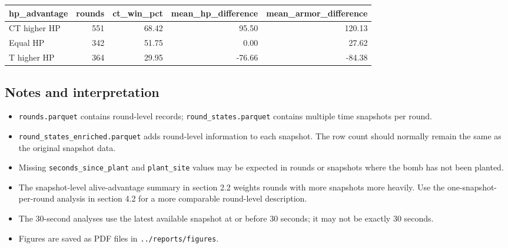 \documentclass[
  letterpaper,
  DIV=11,
  numbers=noendperiod]{scrartcl}
\newcounter{none} %
\providecommand{\tightlist}{%
  \setlength{\itemsep}{0pt}\setlength{\parskip}{0pt}}
\begin{document}
{\def\LTcaptype{none} %
\begin{longtable}[]{@{}lrrrr@{}}
\toprule\noalign{}
hp\_advantage & rounds & ct\_win\_pct & mean\_hp\_difference &
mean\_armor\_difference \\
\midrule\noalign{}
\endhead
\bottomrule\noalign{}
\endlastfoot
CT higher HP & 551 & 68.42 & 95.50 & 120.13 \\
Equal HP & 342 & 51.75 & 0.00 & 27.62 \\
T higher HP & 364 & 29.95 & -76.66 & -84.38 \\
\end{longtable}
}

\subsection{Notes and interpretation}\label{notes-and-interpretation}

\begin{itemize}
\tightlist
\item
  \texttt{rounds.parquet} contains round-level records;
  \texttt{round\_states.parquet} contains multiple time snapshots per
  round.
\item
  \texttt{round\_states\_enriched.parquet} adds round-level information
  to each snapshot. The row count should normally remain the same as the
  original snapshot data.
\item
  Missing \texttt{seconds\_since\_plant} and \texttt{plant\_site} values
  may be expected in rounds or snapshots where the bomb has not been
  planted.
\item
  The snapshot-level alive-advantage summary in section 2.2 weights
  rounds with more snapshots more heavily. Use the
  one-snapshot-per-round analysis in section 4.2 for a more comparable
  round-level description.
\item
  The 30-second analyses use the latest available snapshot at or before
  30 seconds; it may not be exactly 30 seconds.
\item
  Figures are saved as PDF files in \texttt{../reports/figures}.
\end{itemize}
\end{document}
